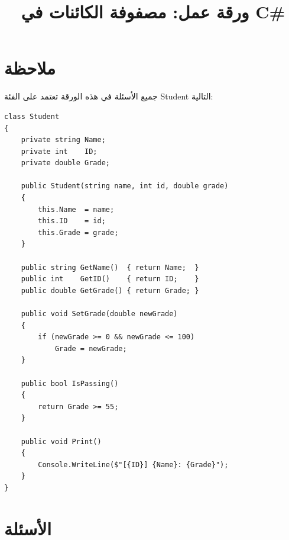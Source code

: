 \documentclass[14pt]{extarticle}
\title{ورقة عمل: مصفوفة الكائنات في \textenglish{C\#}}
\begin{document}
\maketitle
\thispagestyle{fancy}

\section*{ملاحظة}

جميع الأسئلة في هذه الورقة تعتمد على الفئة \textenglish{Student} التالية:

\begin{boxExample}
\begin{english}
\begin{verbatim}
class Student
{
    private string Name;
    private int    ID;
    private double Grade;

    public Student(string name, int id, double grade)
    {
        this.Name  = name;
        this.ID    = id;
        this.Grade = grade;
    }

    public string GetName()  { return Name;  }
    public int    GetID()    { return ID;    }
    public double GetGrade() { return Grade; }

    public void SetGrade(double newGrade)
    {
        if (newGrade >= 0 && newGrade <= 100)
            Grade = newGrade;
    }

    public bool IsPassing()
    {
        return Grade >= 55;
    }

    public void Print()
    {
        Console.WriteLine($"[{ID}] {Name}: {Grade}");
    }
}
\end{verbatim}
\end{english}
\end{boxExample}

\clearpage

\section*{الأسئلة}
\end{document}
